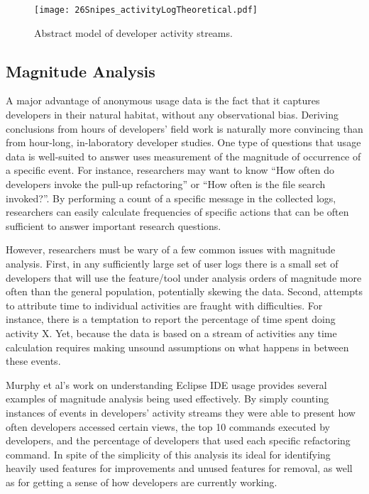 \begin{figure*}[t]
 \centering
\texttt{[image: 26Snipes\_activityLogTheoretical.pdf]}
\caption{Abstract model of developer activity streams.}
\label{fig:theoretical}
\end{figure*}



\subsection{Magnitude Analysis}

A major advantage of anonymous usage data is the fact that it captures developers in their natural habitat, without any observational bias. Deriving conclusions from hours of developers' field work is naturally more convincing than from hour-long, in-laboratory developer studies. One type of questions that usage data is well-suited to answer uses measurement of the magnitude of occurrence of a specific event. For instance, researchers may want to know ``How often do developers invoke the pull-up refactoring'' or ``How often is the file search invoked?''. By performing a count of a specific message in the collected logs, researchers can easily calculate frequencies of specific actions that can be often sufficient to answer important research questions. 

However, researchers must be wary of a few common issues with magnitude analysis. First, in any sufficiently large set of user logs there is a small set of developers that will use the feature/tool under analysis orders of magnitude more often than the general population, potentially skewing the data. 
Second, attempts to attribute time to individual activities are fraught with difficulties. For instance, there is a temptation to report the percentage of time spent doing activity X. Yet, because the data is based on a stream of activities any time calculation requires making unsound assumptions on what happens in between these events.

Murphy et al's work on understanding Eclipse IDE usage provides several examples of magnitude analysis being used effectively. By simply counting instances of events in developers' activity streams they were able to present how often developers accessed certain views, the top 10 commands executed by developers, and the percentage of developers that used each specific refactoring command. In spite of the simplicity of this analysis its ideal for identifying heavily used features for improvements and unused features for removal, as well as for getting a sense of how developers are currently working. 

